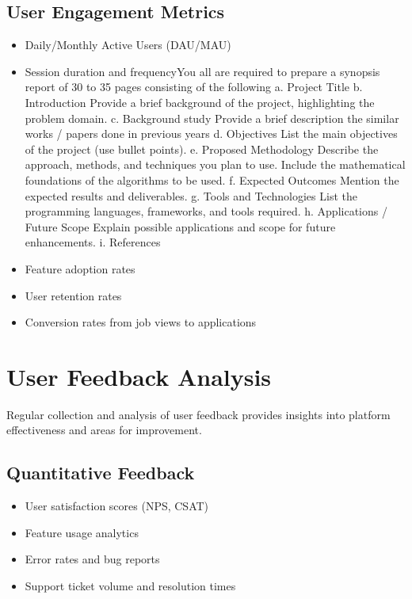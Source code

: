\documentclass[12pt,a4paper]{report}
\begin{document}
\subsection{User Engagement Metrics}
\begin{itemize}[leftmargin=2em]
  \item Daily/Monthly Active Users (DAU/MAU)
  \item Session duration and frequencyYou all are required to prepare a synopsis report of 30 to 35 pages consisting of the 
following 
a. Project Title 
b. Introduction  
Provide a brief background of the project, highlighting the problem domain. 
c. Background study  
Provide a brief description the similar works / papers done in previous years 
d. Objectives 
List the main objectives of the project (use bullet points). 
e. Proposed Methodology 
Describe the approach, methods, and techniques you plan to use. Include the 
mathematical foundations of the algorithms to be used. 
f. 
Expected Outcomes 
Mention the expected results and deliverables. 
g. Tools and Technologies 
List the programming languages, frameworks, and tools required. 
h. Applications / Future Scope 
Explain possible applications and scope for future enhancements. 
i. 
References 
  \item Feature adoption rates
  \item User retention rates
  \item Conversion rates from job views to applications
\end{itemize}

\section{User Feedback Analysis}
Regular collection and analysis of user feedback provides insights into platform effectiveness and areas for improvement.

\subsection{Quantitative Feedback}
\begin{itemize}[leftmargin=2em]
  \item User satisfaction scores (NPS, CSAT)
  \item Feature usage analytics
  \item Error rates and bug reports
  \item Support ticket volume and resolution times
\end{itemize}
\end{document}
